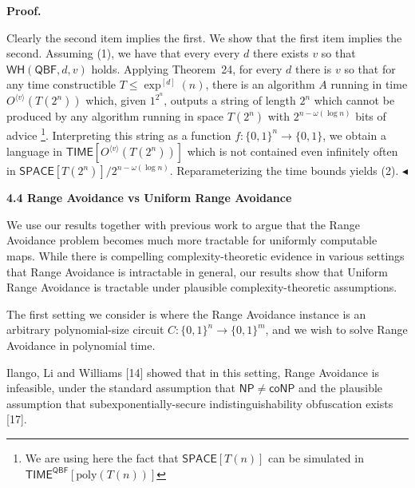 \documentclass[10pt,a4paper]{article}
\begin{document}



\par\medskip\noindent\textbf{Proof.}\par




Clearly the second item implies the first. We show that the first item implies the second. Assuming (1), we have that every every $d$ there exists $v$ so that $\mathsf{WH}(\mathsf{QBF},d,v)$ holds. Applying Theorem 24, for every $d$ there is $v$ so that for any time constructible $T\leq\exp^{[d]}(n)$, there is an algorithm $A$ running in time $O^{\langle v\rangle}(T(2^{n}))$ which, given $1^{2^{n}}$, outputs a string of length $2^{n}$ which cannot be produced by any algorithm running in space $T(2^{n})$ with $2^{n-\omega(\log n)}$ bits of advice \footnote{We are using here the fact that ${\mathsf{SPACE}}[T(n)]$ can be simulated in ${\mathsf{TIME}}^{\mathsf{QBF}}[\mathrm{poly}(T(n))]$}. Interpreting this string as a function $f:\{0,1\}^{n}\to\{0,1\}$, we obtain a language in ${\mathsf{TIME}}[O^{\langle v\rangle}(T(2^{n}))]$ which is not contained even infinitely often in ${\mathsf{SPACE}}[T(2^{n})]/2^{n-\omega(\log n)}$. Reparameterizing the time bounds yields (2).
$\blacktriangleleft$\par






\par\medskip\noindent\textbf{
4.4 Range Avoidance vs Uniform Range Avoidance}\par




We use our results together with previous work to argue that the Range Avoidance problem becomes much more tractable for uniformly computable maps. While there is compelling complexity-theoretic evidence in various settings that Range Avoidance is intractable in general, our results show that Uniform Range Avoidance is tractable under plausible complexity-theoretic assumptions.\par




The first setting we consider is where the Range Avoidance instance is an arbitrary polynomial-size circuit $C:\{0,1\}^{n}\to\{0,1\}^{m}$, and we wish to solve Range Avoidance in polynomial time.\par




Ilango, Li and Williams [14] showed that in this setting, Range Avoidance is infeasible, under the standard assumption that ${\mathsf{NP}}\neq{\mathsf{coNP}}$ and the plausible assumption that subexponentially-secure indistinguishability obfuscation exists [17].\par
\end{document}
